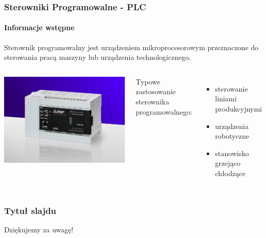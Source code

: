 \documentclass[aspectratio=169]{beamer}
\begin{document}
\begin{frame}
\frametitle{Sterowniki Programowalne - PLC}
\framesubtitle{Informacje wstępne}

Sterownik programowalny jest urządzeniem mikroprocesorowym przeznaczone do sterowania pracą maszyny lub urządzenia technologicznego.
\newline
\begin{columns}

             \includegraphics[width=\linewidth]{Rysunki/PLC.png}

Typowe zastosowanie sterownika programowalnego:

\begin{itemize}
  \item sterowanie liniami produkcyjnymi
  \item urządzenia robotyczne
  \item stanowisko grzejąco chłodzące
\end{itemize}


\end{columns}

\end{frame}




\begin{frame}
\frametitle{Tytuł slajdu}



\begin{center}
\LARGE Dziękujemy za uwagę!

\end{center}
\end{frame}
\end{document}
